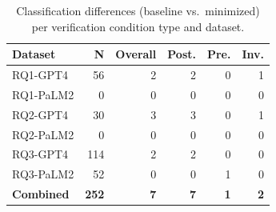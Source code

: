 \begin{table}[h]
  \centering
  \caption{Classification differences (baseline vs.\ minimized) per verification condition type and dataset.}
  \label{tab:minimization-comparison}
  \begin{tabular}{lrrrrr}
    \toprule
    \textbf{Dataset} & \textbf{N} & \textbf{Overall} & \textbf{Post.} & \textbf{Pre.} & \textbf{Inv.} \\
    \midrule
    RQ1-GPT4 & 56 & 2 & 2 & 0 & 1 \\
    RQ1-PaLM2 & 0 & 0 & 0 & 0 & 0 \\
    RQ2-GPT4 & 30 & 3 & 3 & 0 & 1 \\
    RQ2-PaLM2 & 0 & 0 & 0 & 0 & 0 \\
    RQ3-GPT4 & 114 & 2 & 2 & 0 & 0 \\
    RQ3-PaLM2 & 52 & 0 & 0 & 1 & 0 \\
    \midrule
    \textbf{Combined} & \textbf{252} & \textbf{7} & \textbf{7} & \textbf{1} & \textbf{2} \\
    \bottomrule
  \end{tabular}
\end{table}